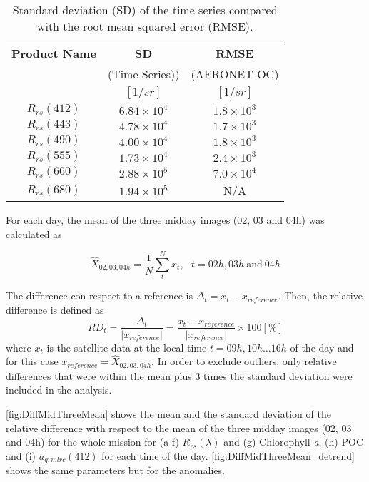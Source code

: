 \documentclass[onecolumn,3p,letterpaper,11pt]{elsarticle}
\begin{document}
\begin{table}[htbp!]
\caption{Standard deviation (SD) of the time series compared with the root mean squared error (RMSE). \label{tab:stdev_aero} } 
\small
\centering
\begin{tabular}{ccc} \hline

 \bfseries{Product Name} & \bfseries{SD} & \bfseries{RMSE}\\
 & (Time Series)) & (AERONET-OC) \\ 
 & $[1/sr]$ & $[1/sr]$ \\ \hline \hline
$R_{rs}(412)$ & $6.84\times10^4$ & $1.8\times10^3$\\ 
$R_{rs}(443)$ & $4.78\times10^4$ & $1.7\times10^3$\\ 
$R_{rs}(490)$ & $4.00\times10^4$ & $1.8\times10^3$\\ 
$R_{rs}(555)$ & $1.73\times10^4$ & $2.4\times10^3$\\ 
$R_{rs}(660)$ & $2.88\times10^5$ & $7.0\times10^4$\\ 
$R_{rs}(680)$ & $1.94\times10^5$ & N/A \\ \hline
 \end{tabular}
\end{table}



For each day, the mean of the three midday images (02, 03 and 04h) was calculated as

\begin{equation}
	\hat{X}_{02,03,04h} = \frac{1}{N} \sum_{t}^N x_t,~~~t=02h,03h~\text{and}~04h
\end{equation}

The difference con respect to a reference is $\Delta_t=x_t-x_{reference}$. Then, the relative difference is defined as
\begin{equation}
	RD_t = \frac{\Delta_t}{|x_{reference}|} = \frac{x_t-x_{reference}}{|x_{reference}|}
	\times 100[\%]
\end{equation}
where $x_t$ is the satellite data at the local time $t=09h,10h\dots16h$ of the day and for this case $x_{reference}=\hat{X}_{02,03,04h}$. In order to exclude outliers, only relative differences that were within the mean plus 3 times the standard deviation were included in the analysis.

\autoref{fig:DiffMidThreeMean} shows the mean and the standard deviation of the relative difference with respect to the mean of the three midday images (02, 03 and 04h) for the whole mission for (a-f) $R_{rs}(\lambda)$ and (g) Chlorophyll-{\it a}, (h) POC and (i) $a_{g:mlrc}(412)$ for each time of the day. \autoref{fig:DiffMidThreeMean_detrend} shows the same parameters but for the anomalies. 
\end{document}
